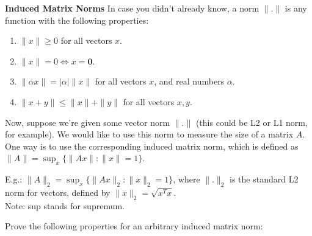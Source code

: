 \documentclass[solution,addpoints,12pt]{exam}
\newenvironment{Solution}{\begin{solution}}{\end{solution}}
\begin{document}
\begin{questions}
\question * \textbf{Induced Matrix Norms}
\newline
In case you didn't already know, a norm $\|.\|$ is any function with the following properties:
\begin{enumerate}
    \item $\|x\| \geq 0$ for all vectors $x$.
    \item $\|x\| = 0 \iff x = \mathbf{0}$.
    \item $\|\alpha x\| = |\alpha| \|x\|$ for all vectors $x$, and real numbers $\alpha$.
    \item $\|x + y\| \leq \|x\| + \|y\|$ for all vectors $x, y$.
\end{enumerate}

Now, suppose we're given some vector norm $\|.\|$ (this could be L2 or L1 norm, for example). We would like to use this norm to measure the size of a matrix $A$. One way is to use the corresponding induced matrix norm, which is defined as $\|A\| = \sup_{x} \{\| Ax \| : \|x \| = 1\}$.

E.g.: $\|A\|_2 = \sup_{x} \{ \|Ax\|_2 : \|x\|_2 = 1 \}$, where $\|.\|_2$ is the standard L2 norm for vectors, defined by $\|x\|_2 = \sqrt{x^Tx}$.\\
Note: sup stands for supremum.

Prove the following properties for an arbitrary induced matrix norm:

\end{questions}
\end{document}
